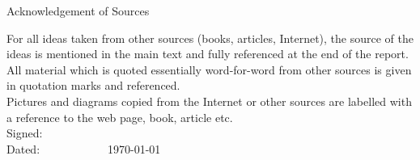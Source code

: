 \documentclass[12pt, a4paper, pdflatex, leqno, twoside]{report}
\begin{document}
\newpage
\thispagestyle{empty}
\mbox{}

\newpage
\thispagestyle{empty}
\mbox{}



\begin{center}Acknowledgement of Sources\\[2cm]\end{center}
For all ideas taken from other sources (books, articles, Internet), the source 
of the ideas is mentioned in the main text and fully referenced at the end of 
the report.\\[0.5cm]
All material which is quoted essentially word-for-word from other sources is 
given in quotation marks and referenced.\\[.5cm]
Pictures and diagrams copied from the Internet or other sources are labelled 
with a reference to the web page, book, article etc.\\[2cm]
Signed:\\[1cm]
Dated:~~~~~~~~~~~~\today


\newpage
\thispagestyle{empty}
\mbox{}



\end{document}
